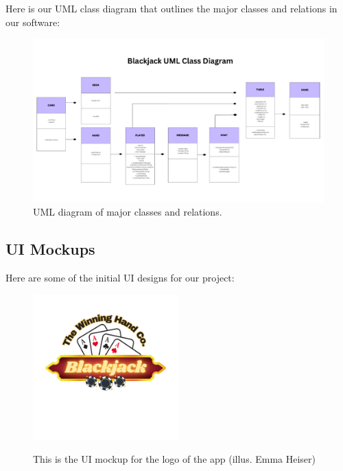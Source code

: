 Here is our UML class diagram that outlines the major classes and relations in our software:  

\begin{figure}[hbt!]
    \centering
    \includegraphics[width=0.8\linewidth]{figures/UML Diagram Whiteboard.pdf}
    \caption{UML diagram of major classes and relations.}
    \label{fig:UML}
\end{figure}

\pagebreak

\subsection{UI Mockups}
Here are some of the initial UI designs for our project:

\begin{figure}[hbt!]
    \centering
    \includegraphics[width=0.5\textwidth]{figures/Blackjack.png} \\
    \caption{This is the UI mockup for the logo of the app (illus. Emma Heiser)}
    \label{fig:logo}
\end{figure}

